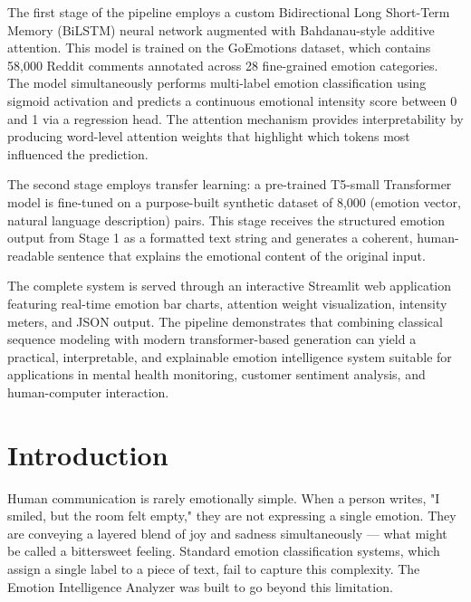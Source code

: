\documentclass[12pt, a4paper]{report}
\begin{document}
The first stage of the pipeline employs a custom Bidirectional Long Short-Term Memory (BiLSTM) neural network augmented with Bahdanau-style additive attention. This model is trained on the GoEmotions dataset, which contains 58,000 Reddit comments annotated across 28 fine-grained emotion categories. The model simultaneously performs multi-label emotion classification using sigmoid activation and predicts a continuous emotional intensity score between 0 and 1 via a regression head. The attention mechanism provides interpretability by producing word-level attention weights that highlight which tokens most influenced the prediction.

The second stage employs transfer learning: a pre-trained T5-small Transformer model is fine-tuned on a purpose-built synthetic dataset of 8,000 (emotion vector, natural language description) pairs. This stage receives the structured emotion output from Stage 1 as a formatted text string and generates a coherent, human-readable sentence that explains the emotional content of the original input.

The complete system is served through an interactive Streamlit web application featuring real-time emotion bar charts, attention weight visualization, intensity meters, and JSON output. The pipeline demonstrates that combining classical sequence modeling with modern transformer-based generation can yield a practical, interpretable, and explainable emotion intelligence system suitable for applications in mental health monitoring, customer sentiment analysis, and human-computer interaction.

\newpage

\chapter{Introduction}

Human communication is rarely emotionally simple. When a person writes, "I smiled, but the room felt empty," they are not expressing a single emotion. They are conveying a layered blend of joy and sadness simultaneously — what might be called a bittersweet feeling. Standard emotion classification systems, which assign a single label to a piece of text, fail to capture this complexity. The Emotion Intelligence Analyzer was built to go beyond this limitation.
\end{document}
